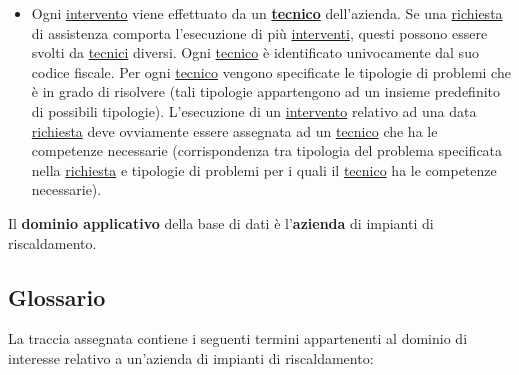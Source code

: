 \documentclass{article}
\begin{document}
{{\begin{itemize}
            \item Ogni \underline{intervento} viene effettuato da un \textbf{\underline{tecnico}} dell’azienda. Se una \underline{richiesta} di assistenza comporta l’esecuzione di più \underline{interventi}, questi possono essere svolti da \underline{tecnici} diversi. Ogni \underline{tecnico} è identificato univocamente dal suo codice fiscale. Per ogni \underline{tecnico} vengono specificate le tipologie di problemi che è in grado di risolvere (tali tipologie appartengono ad un insieme predefinito di possibili tipologie). L’esecuzione di un \underline{intervento} relativo ad una data \underline{richiesta} deve ovviamente essere assegnata ad un \underline{tecnico} che ha le competenze necessarie (corrispondenza tra tipologia del problema specificata nella \underline{richiesta} e tipologie di problemi per i quali il \underline{tecnico} ha le competenze necessarie).

        \end{itemize}
    }%
}

Il \textbf{dominio applicativo} della base di dati è l'\textbf{azienda} di impianti di riscaldamento.

\subsection{Glossario}

La traccia assegnata contiene i seguenti termini appartenenti al dominio di interesse relativo a un'azienda di impianti di riscaldamento:
\end{document}
